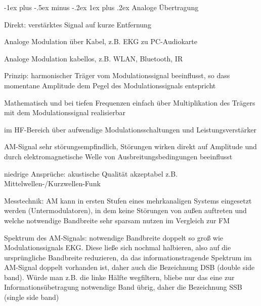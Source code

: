 \documentclass[a4paper]{article}
\makeatletter
\renewcommand{\subsubsection}{\@startsection{subsubsection}{3}{0mm}%
 {-1ex plus -.5ex minus -.2ex}%
 {1ex plus .2ex}%
 {\normalfont\small\bfseries}}
\makeatother
\begin{document}
\begin{multicols}{3}
  \subsubsection{Analoge Übertragung}\label{analoge-uebertragung}
  \begin{itemize*}
    \item Direkt: verstärktes Signal auf kurze Entfernung
    \item Analoge Modulation über Kabel, z.B. EKG zu PC-Audiokarte
    \item Analoge Modulation kabellos, z.B. WLAN, Bluetooth, IR
    \item Prinzip: harmonischer Träger vom Modulationssignal beeinflusst, so dass momentane Amplitude dem Pegel des Modulationssignals entspricht
    \begin{itemize*}
      \item Mathematisch und bei tiefen Frequenzen einfach über Multiplikation des Trägers mit dem Modulationssignal realisierbar
      \item im HF-Bereich über aufwendige Modulationsschaltungen und Leistungsverstärker
      \item AM-Signal sehr störungsempfindlich, Störungen wirken direkt auf Amplitude und durch elektromagnetische Welle von Ausbreitungsbedingungen beeinflusst
      \item niedrige Ansprüche: akustische Qualität akzeptabel z.B. Mittelwellen-/Kurzwellen-Funk
      \item Messtechnik: AM kann in ersten Stufen eines mehrkanaligen Systems eingesetzt werden (Untermodulatoren), in dem keine Störungen von außen auftreten und welche notwendige Bandbreite sehr sparsam nutzen im Vergleich zur FM
    \end{itemize*}
    \item Spektrum des AM-Signals: notwendige Bandbreite doppelt so groß wie Modulationssignals EKG. Diese ließe sich nochmal halbieren, also auf die ursprüngliche Bandbreite reduzieren, da das informationstragende Spektrum im AM-Signal doppelt vorhanden ist, daher auch die Bezeichnung DSB (double side band). Würde man z.B. die linke Hälfte wegfiltern, bliebe nur das eine zur Informationsübetragung notwendige Band übrig, daher die Bezeichnung SSB (single side band)

\end{itemize*}
\end{multicols}
\end{document}
